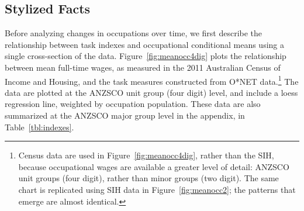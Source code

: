 \subsection{Stylized Facts}

Before analyzing changes in occupations over time, we first describe the relationship between task indexes and occupational conditional means using a single cross-section of the data. Figure~\ref{fig:meanocc4dig} plots the relationship between mean full-time wages, as measured in the 2011 Australian Census of Income and Housing, and the task measures constructed from O*NET data.\footnote{Census data are used in Figure~\ref{fig:meanocc4dig}, rather than the SIH, because occupational wages are available a greater level of detail: ANZSCO unit groups (four digit), rather than minor groups (two digit). The same chart is replicated using SIH data in Figure~\ref{fig:meanocc2}; the patterns that emerge are almost identical.} The data are plotted at the ANZSCO unit group (four digit) level, and include a loess regression line, weighted by occupation population. These data are also summarized at the ANZSCO major group level in the appendix, in Table~\ref{tbl:indexes}.

